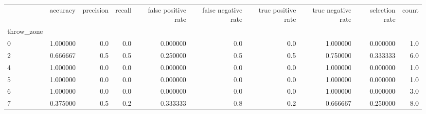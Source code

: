 \begin{tabular}{lrrrrrrrrr}
\toprule
{} &  accuracy &  precision &  recall &  false positive rate &  false negative rate &  true positive rate &  true negative rate &  selection rate &  count \\
throw\_zone &           &            &         &                      &                      &                     &                     &                 &        \\
\midrule
0          &  1.000000 &        0.0 &     0.0 &             0.000000 &                  0.0 &                 0.0 &            1.000000 &        0.000000 &    1.0 \\
2          &  0.666667 &        0.5 &     0.5 &             0.250000 &                  0.5 &                 0.5 &            0.750000 &        0.333333 &    6.0 \\
4          &  1.000000 &        0.0 &     0.0 &             0.000000 &                  0.0 &                 0.0 &            1.000000 &        0.000000 &    1.0 \\
5          &  1.000000 &        0.0 &     0.0 &             0.000000 &                  0.0 &                 0.0 &            1.000000 &        0.000000 &    1.0 \\
6          &  1.000000 &        0.0 &     0.0 &             0.000000 &                  0.0 &                 0.0 &            1.000000 &        0.000000 &    3.0 \\
7          &  0.375000 &        0.5 &     0.2 &             0.333333 &                  0.8 &                 0.2 &            0.666667 &        0.250000 &    8.0 \\
\bottomrule
\end{tabular}
